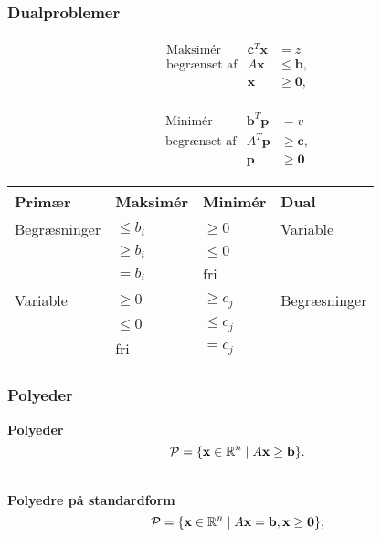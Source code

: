 \begin{frame}
\frametitle{Dualproblemer}
\begin{align*}
\begin{array}{lrl}
\text{Maksimér}		&\textbf{c}^T\textbf{x}	& = z		\\
\text{begrænset af}	&A\textbf{x}	&\leq \mathbf{b},	\\
					&\mathbf{x}				&\geq \mathbf{0},
\end{array}
\end{align*}
%

%

\begin{align*}
\begin{array}{lrl}
\text{Minimér}		&\textbf{b}^T\textbf{p}	& = v			\\
\text{begrænset af}	&A^T \textbf{p}	&\geq \mathbf{c},	\\
					&\mathbf{p}				&\geq \mathbf{0}
\end{array}
\end{align*}
\begin{center}
\begin{tabular}{llll}
Primær  & Maksimér   & Minimér    & Dual         \\
\hline
Begræsninger & $\leq b_i$ & $\geq 0$   & Variable     \\
             & $\geq b_i$ & $\leq 0$   &              \\
             & $=b_i$     & fri        &            \\ 
\hline             
Variable     & $\geq 0$   & $\geq c_j$ & Begræsninger \\
             & $\leq 0$   & $\leq c_j$ &              \\
             & fri        & $=c_j$     &  
\end{tabular}
\end{center}
\end{frame}

\begin{frame}
\frametitle{Polyeder}
\textbf{Polyeder}
$$\mathcal{P} = \{\textbf{x} \in \R^n \mid A\mathbf{x}\geq \textbf{b}\}.$$
\\
$
\begin{array}{cc}
&

\end{array}
$
\\
\textbf{Polyedre på standardform} 
$$\mathcal{P}=\{ \mathbf{x} \in \R^n  \mid  A\mathbf{x}=\mathbf{b}, \mathbf{x} \geq \mathbf{0} \},$$
\end{frame}

